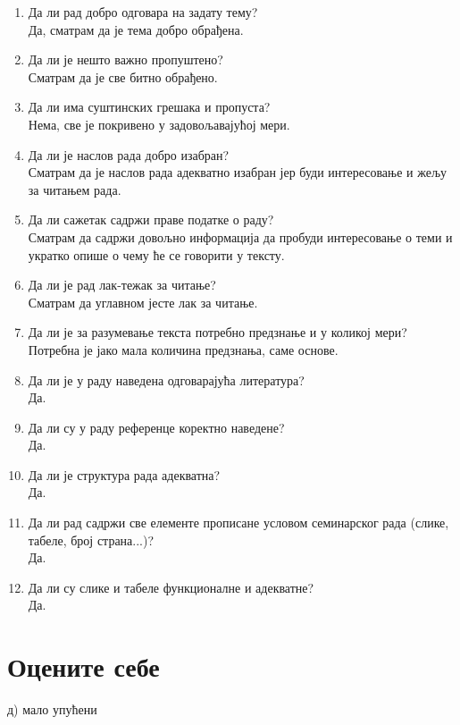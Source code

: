 \documentclass[a4paper]{report}
\begin{document}
\begin{enumerate}
\item Да ли рад добро одговара на задату тему?\\
Да, сматрам да је тема добро обрађена.
\item Да ли је нешто важно пропуштено?\\
Сматрам да је све битно обрађено.
\item Да ли има суштинских грешака и пропуста?\\
Нема, све је покривено у задовољавајућој мери.
\item Да ли је наслов рада добро изабран?\\
Сматрам да је наслов рада адекватно изабран јер буди интересовање и жељу за читањем рада.
\item Да ли сажетак садржи праве податке о раду?\\
Сматрам да садржи довољно информација да пробуди интересовање о теми и укратко опише о чему ће се говорити у тексту.
\item Да ли је рад лак-тежак за читање?\\
Сматрам да углавном јесте лак за читање.
\item Да ли је за разумевање текста потребно предзнање и у коликој мери?\\
Потребна је јако мала количина предзнања, саме основе.
\item Да ли је у раду наведена одговарајућа литература?\\
Да.
\item Да ли су у раду референце коректно наведене?\\
Да.
\item Да ли је структура рада адекватна?\\
Да.
\item Да ли рад садржи све елементе прописане условом семинарског рада (слике, табеле, број страна...)?\\
Да.
\item Да ли су слике и табеле функционалне и адекватне?\\
Да.
\end{enumerate}

\section{Оцените себе}
д) мало упућени
\end{document}
